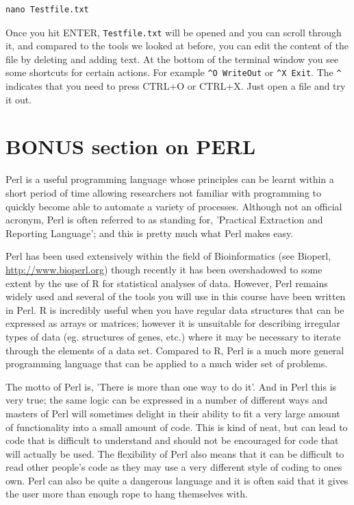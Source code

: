 \documentclass[11pt]{article}
\begin{document}
\begin{verbatim}
nano Testfile.txt
\end{verbatim}

Once you hit ENTER, \texttt{Testfile.txt} will be opened and you can scroll
through it, and compared to the tools we looked at before, you can
edit the content of the file by deleting and adding text. At the
bottom of the terminal window you see some shortcuts for certain
actions. For example \texttt{\textasciicircum{}O WriteOut} or \texttt{\textasciicircum{}X Exit}. The \texttt{\textasciicircum{}} indicates
that you need to press CTRL+O or CTRL+X. Just open a file and try it
out. 

\section{BONUS section on PERL}
\label{sec-9}

Perl is a useful programming language whose principles can be learnt
within a short period of time allowing researchers not familiar with
programming to quickly become able to automate a variety of processes.
Although not an official acronym, Perl is often referred to as standing
for, 'Practical Extraction and Reporting Language'; and this is pretty much
what Perl makes easy.

Perl has been used extensively within the field of Bioinformatics (see
Bioperl, \url{http://www.bioperl.org}) though recently it has been overshadowed to
some extent by the use of R for statistical analyses of data. However,
Perl remains widely used and several of the tools you will use in this
course have been written in Perl. R is incredibly useful when you have
regular data structures that can be expressed as arrays or matrices;
however it is unsuitable for describing irregular types of data (eg.
structures of genes, etc.) where it may be necessary to iterate through
the elements of a data set. Compared to R, Perl is a much more general
programming language that can be applied to a much wider set of
problems.

The motto of Perl is, 'There is more than one way to do it'. And in Perl
this is very true; the same logic can be expressed in a number of
different ways and masters of Perl will sometimes delight in their
ability to fit a very large amount of functionality into a small amount
of code. This is kind of neat, but can lead to code that is difficult to
understand and should not be encouraged for code that will
actually be used. The flexibility of Perl also means that it can be
difficult to read other people's code as they may use a very different
style of coding to ones own. Perl can also be quite a dangerous language
and it is often said that it gives the user more than enough rope to
hang themselves with.
\end{document}
